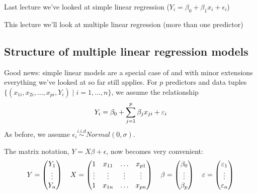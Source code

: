 Last lecture we've looked at simple linear regression ($Y_i=\beta_0 + \beta_1x_i + \epsilon_i$)
\begin{center}
\end{center}

This lecture we'll look at multiple linear regression (more than one predictor)


\subsection{Structure of multiple linear regression models}

Good news: simple linear models are a special case of  and with minor extensions everything we've looked at so far still applies. For $p$ predictors and data tuples $\{(x_{1i},x_{2i},...,x_{pi},Y_i)\mid i=1,...,n\}$, we assume the relationship
\begin{align}
	Y_i = \beta_0 + \sum_{j=1}^{p} \beta_jx_{ji} + \epsilon_i\notag
\end{align}
As before, we assume $\epsilon_i\overset{i.i.d}{\sim}Normal(0,\sigma)$. 

The matrix notation, $Y=X\beta + \epsilon$, now becomes very convenient:
\begin{align}
	Y = \begin{pmatrix}
		Y_1 \\ \vdots \\ Y_n
	\end{pmatrix}\quad X = \begin{pmatrix}
		1 & x_{11} & \dots & x_{p1} \\ \vdots & \vdots & \vdots & \vdots \\ 1 & x_{1n} & \dots &  x_{pn}
	\end{pmatrix} \quad \beta = \begin{pmatrix}
		\beta_0 \\ \vdots \\ \beta_p
	\end{pmatrix}\quad \epsilon = \begin{pmatrix}
		\epsilon_1 \\ \vdots \\ \epsilon_n
	\end{pmatrix} \notag
\end{align}

